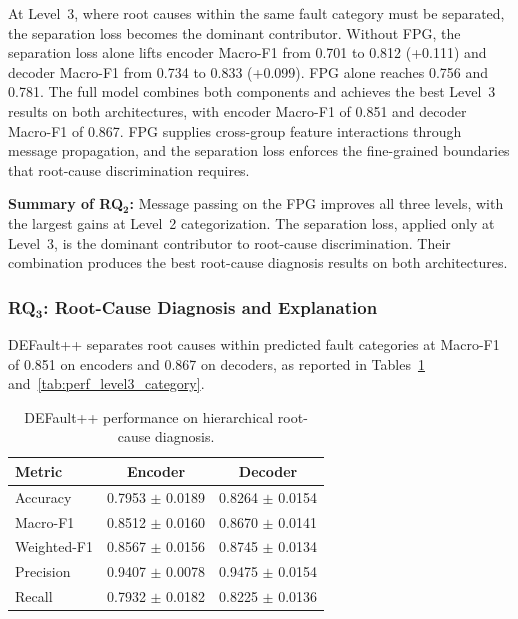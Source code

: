 At Level~3, where root causes within the same fault category must be separated, the separation loss becomes the dominant contributor. Without FPG, the separation loss alone lifts encoder Macro-F1 from 0.701 to 0.812 (+0.111) and decoder Macro-F1 from 0.734 to 0.833 (+0.099). FPG alone reaches 0.756 and 0.781. The full model combines both components and achieves the best Level~3 results on both architectures, with encoder Macro-F1 of 0.851 and decoder Macro-F1 of 0.867. FPG supplies cross-group feature interactions through message propagation, and the separation loss enforces the fine-grained boundaries that root-cause discrimination requires.

\FloatBarrier

\begin{rqsummary}
\textbf{Summary of RQ$\mathbf{_2}$:} Message passing on the FPG improves all three levels, with the largest gains at Level~2 categorization. The separation loss, applied only at Level~3, is the dominant contributor to root-cause discrimination. Their combination produces the best root-cause diagnosis results on both architectures.
\end{rqsummary}

\subsubsection{\textbf{RQ$\mathbf{_3}$:} Root-Cause Diagnosis and Explanation}
\label{sec:defaultpp_rq3}

DEFault++ separates root causes within predicted fault categories at Macro-F1 of 0.851 on encoders and 0.867 on decoders, as reported in Tables~\ref{tab:perf_level3_overall} and~\ref{tab:perf_level3_category}.

\begin{table}[!htbp]
\centering
\caption{DEFault++ performance on hierarchical root-cause diagnosis.}
\label{tab:perf_level3_overall}
\begin{tabular}{l c c}
\toprule
\textbf{Metric} & \textbf{Encoder} & \textbf{Decoder} \\
\midrule
Accuracy & 0.7953 $\pm$ 0.0189 & 0.8264 $\pm$ 0.0154 \\
Macro-F1 & 0.8512 $\pm$ 0.0160 & 0.8670 $\pm$ 0.0141 \\
Weighted-F1 & 0.8567 $\pm$ 0.0156 & 0.8745 $\pm$ 0.0134 \\
Precision & 0.9407 $\pm$ 0.0078 & 0.9475 $\pm$ 0.0154 \\
Recall & 0.7932 $\pm$ 0.0182 & 0.8225 $\pm$ 0.0136 \\
\bottomrule
\end{tabular}
\end{table}

